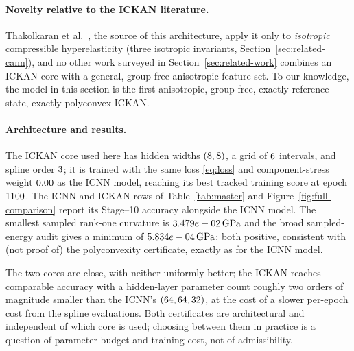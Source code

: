 \documentclass[10pt,a4paper]{article}
\begin{document}
\paragraph{Novelty relative to the ICKAN literature.} Thakolkaran et
al.~\cite{Thakolkaran2025}, the source of this architecture, apply it only
to \emph{isotropic} compressible hyperelasticity (three isotropic
invariants, Section~\ref{sec:related-cann}), and no other work surveyed
in Section~\ref{sec:related-work} combines an ICKAN core with a general,
group-free anisotropic feature set. To our knowledge, the model in this
section is the first anisotropic, group-free, exactly-reference-state,
exactly-polyconvex ICKAN.

\paragraph{Architecture and results.} The ICKAN core used here has hidden
widths $(8,8{})$, a grid of $6{}$ intervals, and
spline order $3{}$; it is trained with the same loss
\eqref{eq:loss} and component-stress weight $0.00{}$ as
the ICNN model, reaching its best tracked training score at epoch
$1100{}$. The ICNN and ICKAN rows of Table~\ref{tab:master} and
Figure~\ref{fig:full-comparison} report its Stage--10 accuracy alongside
the ICNN model. The smallest sampled rank-one curvature is
$3.479e-02\,\mathrm{GPa}$ and the broad sampled-energy audit gives a
minimum of $5.834e-04\,\mathrm{GPa}$: both positive, consistent with
(not proof of) the polyconvexity certificate, exactly as for the ICNN
model.

The two cores are close, with neither uniformly better; the ICKAN reaches
comparable accuracy with a hidden-layer parameter count roughly two
orders of magnitude smaller than the ICNN's $(64,64,32{})$, at the
cost of a slower per-epoch cost from the spline evaluations. Both
certificates are architectural and independent of which core is used;
choosing between them in practice is a question of parameter budget and
training cost, not of admissibility.
\end{document}
